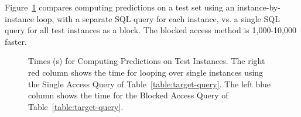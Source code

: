 \documentclass{acm_proc_article-sp}
\begin{document}
Figure~\ref{fig:test-timing} compares computing predictions on a test set using an instance-by-instance loop, with a separate SQL query for each instance, vs. a single SQL query for all test instances as a block. The blocked access method is 1,000-10,000 faster. 


\begin{figure}[htbp] %
 \centering
{} 
\caption{Times (s) for Computing Predictions on Test Instances. The right red column shows the time for looping over single instances using the Single Access Query of Table~\ref{table:target-query}. The left blue column shows the time for the Blocked Access Query of Table~\ref{table:target-query}.
}
 \label{fig:test-timing}
\end{figure}

\begin{table}[htbp]
  \centering
        \caption{Model Manager Evaluation.}
  \label{tab:model}%
\end{table}%
\end{document}

